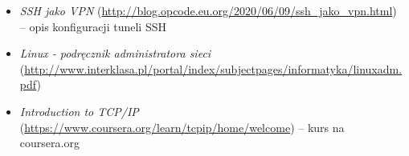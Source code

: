 % 
% 
% 
% 

\begin{itemize}
\item \textit{SSH jako VPN} (\url{http://blog.opcode.eu.org/2020/06/09/ssh_jako_vpn.html}) – opis konfiguracji tuneli SSH
\item \textit{Linux - podręcznik administratora sieci} (\url{http://www.interklasa.pl/portal/index/subjectpages/informatyka/linuxadm.pdf})
\item \textit{Introduction to TCP/IP} (\url{https://www.coursera.org/learn/tcpip/home/welcome}) – kurs na coursera.org
\end{itemize}
